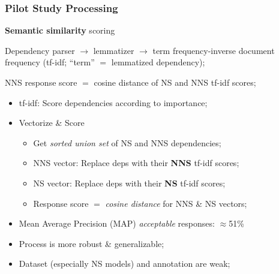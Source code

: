 \documentclass[handout,xcolor={dvipsnames}]{beamer}
\begin{document}
\begin{frame}
\frametitle{Pilot Study Processing}
\textbf{Semantic similarity} scoring

\medskip
\pause
Dependency parser $\rightarrow$ lemmatizer $\rightarrow$ term frequency-inverse document frequency (tf-idf; ``term'' $=$ lemmatized dependency);

\pause
\medskip
NNS response score $=$ cosine distance of NS and NNS tf-idf scores;
\pause

\begin{itemize}
\pause
\item tf-idf: Score dependencies according to importance; 
\pause
\item Vectorize \& Score
\begin{itemize}
\pause
\item Get \textit{sorted union set} of NS and NNS dependencies;
\pause
\item NNS vector: Replace deps with their \textbf{NNS} tf-idf scores;
\pause
\item NS vector: Replace deps with their \textbf{NS} tf-idf scores;
\pause
\item Response score $=$ \textit{cosine distance} for NNS \& NS vectors;
\end{itemize}
\item Mean Average Precision (MAP) \textit{acceptable} responses: $\approx$51\%
\item Process is more robust \& generalizable;
\item Dataset (especially NS models) and annotation are weak;
\end{itemize}
\end{frame}
\end{document}
